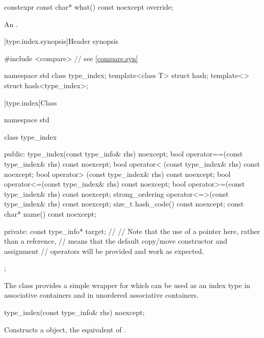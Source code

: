 %
\begin{itemdecl}
constexpr const char* what() const noexcept override;
\end{itemdecl}

\begin{itemdescr}
\pnum
\returns
An  \ntbs{}.
\end{itemdescr}

[type.index.synopsis]{Header  synopsis}

%
\begin{codeblock}
#include <compare>              // see \ref{compare.syn}

namespace std {
  class type_index;
  template<class T> struct hash;
  template<> struct hash<type_index>;
}
\end{codeblock}

[type.index]{Class }

%
\begin{codeblock}
namespace std {
  class type_index {
  public:
    type_index(const type_info& rhs) noexcept;
    bool operator==(const type_index& rhs) const noexcept;
    bool operator< (const type_index& rhs) const noexcept;
    bool operator> (const type_index& rhs) const noexcept;
    bool operator<=(const type_index& rhs) const noexcept;
    bool operator>=(const type_index& rhs) const noexcept;
    strong_ordering operator<=>(const type_index& rhs) const noexcept;
    size_t hash_code() const noexcept;
    const char* name() const noexcept;

  private:
    const type_info* target;    // \expos
    // Note that the use of a pointer here, rather than a reference,
    // means that the default copy/move constructor and assignment
    // operators will be provided and work as expected.
  };
}
\end{codeblock}

\pnum
The class  provides a simple wrapper for
 which can be used as an index type in associative
containers and in unordered associative
containers.

%
\begin{itemdecl}
type_index(const type_info& rhs) noexcept;
\end{itemdecl}

\begin{itemdescr}
\pnum
\effects
Constructs a  object, the equivalent of .
\end{itemdescr}

